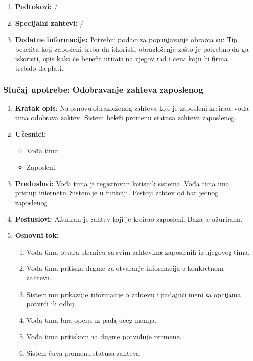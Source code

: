 \documentclass[a4paper]{article}
\begin{document}
\begin{enumerate}
\begin{enumerate}
        \end{enumerate}
    \item \textbf{Podtokovi:} /
    \item \textbf{Specijalni zahtevi:} /
    \item \textbf{Dodatne informacije:} Potrebni podaci za popunjavanje obrazca su: Tip benefita koji zaposleni treba da iskoristi, obrazloženje zašto je potrebno da ga iskoristi, opis kako će benefit uticati na njegov rad i cena koju bi firma trebalo da plati.
\end{enumerate}

\subsubsection{Slučaj upotrebe: Odobravanje zahteva zaposlenog}
\begin{enumerate}
    \item \textbf{Kratak opis}: Na osnovu obrazloženog zahteva koji je zaposleni kreirao, vođa tima odobrava zahtev. Sistem beleži promenu statusa zahteva zaposlenog.
    \item \textbf{Učesnici:}
        \begin{itemize}
            \item Vođa tima
            \item Zaposleni
        \end{itemize}
    \item \textbf{Preduslovi:} Vođa tima je registrovan korisnik sistema. Vođa tima ima pristup internetu. Sistem je u funkciji. Postoji zahtev od bar jednog zaposlenog.
    \item \textbf{Postuslovi:} Ažuriran je zahtev koji je kreirao zaposleni. Baza je ažurirana.
    \item \textbf{Osnovni tok:}
        \begin{enumerate}
            \item Vođa tima otvara stranicu sa svim zahtevima zaposlenih iz njegovog tima.
            \item Vođa tima pritiska dugme za otvaranje informacija o konkretnom zahtevu.
            \item Sistem mu prikazuje informacije o zahtevu i padajući meni sa opcijama potvrdi ili odbij.
            \item Vođa tima bira opciju iz padajućeg menija.
            \item Vođa tima pritiskom na dugme potvrđuje promene.
            \item Sistem čuva promenu statusa zahteva.

\end{enumerate}
\end{enumerate}
\end{document}
